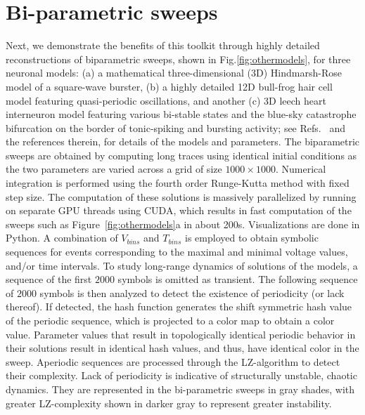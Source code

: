 \documentclass{ws-book9x6}
\begin{document}
\section{Bi-parametric sweeps}
Next, we demonstrate the benefits of this toolkit through highly detailed reconstructions of biparametric sweeps, shown in Fig.\ref{fig:othermodels}, for three neuronal models:  (a) a mathematical three-dimensional (3D) Hindmarsh-Rose model of a square-wave burster, (b) a highly detailed 12D bull-frog hair cell model featuring quasi-periodic oscillations, and another (c) 3D leech heart interneuron model featuring various bi-stable states and the blue-sky catastrophe bifurcation on the border of tonic-spiking and bursting activity; see Refs.~\citep{bar2011, barrio2014, neiman2011, ju2018, shilnikov2012} and the references therein, for details of the models and parameters. The biparametric sweeps are obtained by computing long traces using identical initial conditions as the two parameters are varied across a grid of size $1000\times 1000$. Numerical integration is performed using the fourth order Runge-Kutta method with fixed step size. The computation of these solutions is massively parallelized by running on separate GPU threads using CUDA, which results in fast computation of the sweeps such as Figure~\ref{fig:othermodels}a in about 200s. Visualizations are done in Python. A combination of $V_{bins}$ and $T_{bins}$ is employed to obtain symbolic sequences for events corresponding to the maximal and minimal voltage values, and/or time intervals. To study long-range dynamics of solutions of the models, a sequence of the first $2000$ symbols is omitted as transient. The following sequence of $2000$ symbols is then analyzed to detect the existence of periodicity (or lack thereof). If detected, the hash function generates the shift symmetric hash value of the periodic sequence, which is projected to a color map to obtain a color value. Parameter values that result in topologically identical periodic behavior in their solutions result in identical hash values, and thus, have identical color in the sweep. Aperiodic sequences are processed through the LZ-algorithm to detect their complexity. Lack of periodicity is indicative of structurally unstable, chaotic dynamics. They are represented in the bi-parametric sweeps in gray shades, with greater LZ-complexity shown in darker gray to represent greater instability. 
\end{document}
